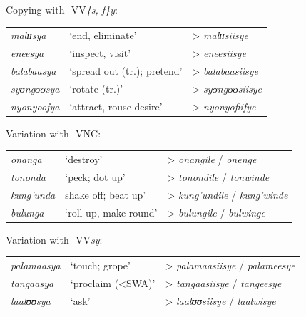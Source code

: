 \begin{exe}
\ex Copying with -VV\textit{\{s, f\}y}:\\
\label{exLongCausCopying}
\begin{tabular}[t]{@{}>{\itshape}lll}
malɪɪsya&`end, eliminate'& > \textit{malɪɪsiisye}
\\eneesya&`inspect, visit'& > \textit{eneesiisye}
\\balabaasya& \lq spread out (tr.); pretend'& > \textit{balabaasiisye}
\\syʊngʊʊsya&`rotate (tr.)'& > \textit{syʊngʊʊsiisye}
\\nyonyoofya&`attract, rouse desire'& > \textit{nyonyofiifye}
\end{tabular}
\ex Variation with -VNC:\label{exImbricationVariationNC}\\
\begin{tabular}[t]{@{}>{\itshape}lll}
onanga& \lq destroy'& > \textit{onangile} / \textit{onenge}
\\tononda&`peck; dot up'& > \textit{tonondile} / \textit{tonwinde}
\\kung'unda&shake off; beat up'& > \textit{kung'undile} / \textit{kung'winde}
\\bulunga&`roll up, make round'& > \textit{bulungile} / \textit{bulwinge}
\end{tabular}
\ex Variation with -VV\textit{sy}:\\
\label{exImbricationVariationLongCaus}
\begin{tabular}[t]{@{}>{\itshape}lll}
palamaasya&`touch; grope'& > \textit{palamaasiisye} / \textit{palameesye}
\\tangaasya& \lq proclaim (<SWA)'& > \textit{tangaasiisye} / \textit{tangeesye}
\\laalʊʊsya& \lq ask'& > \textit{laalʊʊsiisye} / \textit{laalwisye}
\end{tabular}
\end{exe}

